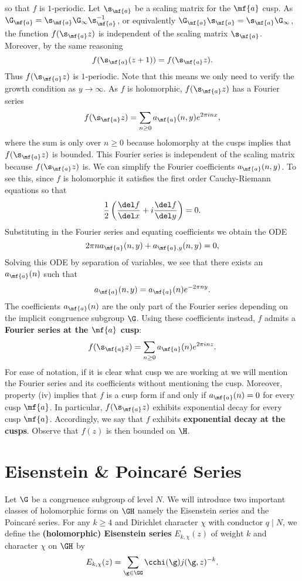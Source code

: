     so that $f$ is $1$-periodic. Let $\s_{\mf{a}}$ be a scaling matrix for the $\mf{a}$ cusp. As $\G_{\mf{a}} = \s_{\mf{a}}\G_{\infty}\s_{\mf{a}}^{-1}$, or equivalently $\G_{\mf{a}}\s_{\mf{a}} = \s_{\mf{a}}\G_{\infty}$, the function $f(\s_{\mf{a}}z)$ is independent of the scaling matrix $\s_{\mf{a}}$. Moreover, by the same reasoning
    \[
      f(\s_{\mf{a}}(z+1)) = f(\s_{\mf{a}}z).
    \]
    Thus $f(\s_{\mf{a}}z)$ is $1$-periodic. Note that this means we only need to verify the growth condition as $y \to \infty$. As $f$ is holomorphic, $f(\s_{\mf{a}}z)$ has a Fourier series
    \[
      f(\s_{\mf{a}}z) = \sum_{n \ge 0}a_{\mf{a}}(n,y)e^{2\pi inx},
    \]
    where the sum is only over $n \ge 0$ because holomorphy at the cusps implies that $f(\s_{\mf{a}}z)$ is bounded. This Fourier series is independent of the scaling matrix because $f(\s_{\mf{a}}z)$ is. We can simplify the Fourier coefficients $a_{\mf{a}}(n,y)$. To see this, since $f$ is holomorphic it satisfies the first order Cauchy-Riemann equations so that
    \[
      \frac{1}{2}\left(\frac{\del f}{\del x}+i\frac{\del f}{\del y}\right) = 0.
    \]
    Substituting in the Fourier series and equating coefficients we obtain the ODE
    \[
      2\pi na_{\mf{a}}(n,y)+a_{\mf{a},y}(n,y) = 0,
    \]
    Solving this ODE by separation of variables, we see that there exists an $a_{\mf{a}}(n)$ such that
    \[
      a_{\mf{a}}(n,y) = a_{\mf{a}}(n)e^{-2\pi ny}.
    \]
    The coefficients $a_{\mf{a}}(n)$ are the only part of the Fourier series depending on the implicit congruence subgroup $\G$. Using these coefficients instead, $f$ admits a \textbf{Fourier series at the $\mf{a}$ cusp}:
    \[
      f(\s_{\mf{a}}z) = \sum_{n \ge 0}a_{\mf{a}}(n)e^{2\pi inz}.
    \]
    For ease of notation, if it is clear what cusp we are working at we will mention the Fourier series and its coefficients without mentioning the cusp. Moreover, property (iv) implies that $f$ is a cusp form if and only if $a_{\mf{a}}(n) = 0$ for every cusp $\mf{a}$. In particular, $f(\s_{\mf{a}}z)$ exhibits exponential decay for every cusp $\mf{a}$. Accordingly, we say that $f$ exhibits \textbf{exponential decay at the cusps}. Observe that $f(z)$ is then bounded on $\H$.
  \section{Eisenstein \& Poincar\'e Series}
    Let $\G$ be a congruence subgroup of level $N$. We will introduce two important classes of holomorphic forms on $\GH$ namely the Eisenstein series and the Poincar\'e series. For any $k \ge 4$ and Dirichlet character $\chi$ with conductor $q \mid N$, we define the \textbf{(holomorphic) Eisenstein series} $E_{k,\chi}(z)$ of weight $k$ and character $\chi$ on $\GH$ by
    \[
      E_{k,\chi}(z) = \sum_{\g \in \GG}\cchi(\g)j(\g,z)^{-k}.
    \]

